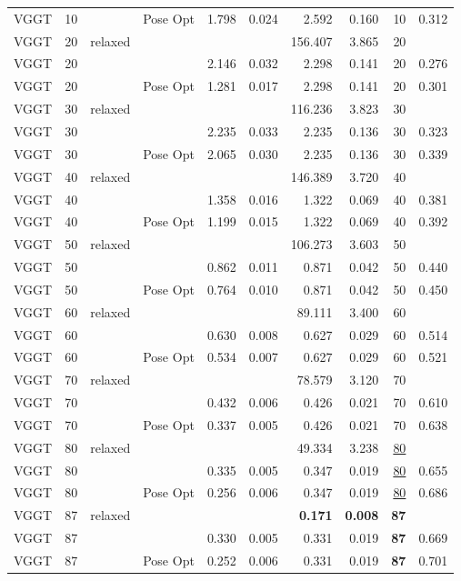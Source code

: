 \begin{table}[H]
\begin{tabular}{lrllrrrrrr}
VGGT & 10 &  & Pose Opt & 1.798 & 0.024 & 2.592 & 0.160 & 10 & 0.312 \\
VGGT & 20 & relaxed &  &  &  & 156.407 & 3.865 & 20 &  \\
VGGT & 20 &  &  & 2.146 & 0.032 & 2.298 & 0.141 & 20 & 0.276 \\
VGGT & 20 &  & Pose Opt & 1.281 & 0.017 & 2.298 & 0.141 & 20 & 0.301 \\
VGGT & 30 & relaxed &  &  &  & 116.236 & 3.823 & 30 &  \\
VGGT & 30 &  &  & 2.235 & 0.033 & 2.235 & 0.136 & 30 & 0.323 \\
VGGT & 30 &  & Pose Opt & 2.065 & 0.030 & 2.235 & 0.136 & 30 & 0.339 \\
VGGT & 40 & relaxed &  &  &  & 146.389 & 3.720 & 40 &  \\
VGGT & 40 &  &  & 1.358 & 0.016 & 1.322 & 0.069 & 40 & 0.381 \\
VGGT & 40 &  & Pose Opt & 1.199 & 0.015 & 1.322 & 0.069 & 40 & 0.392 \\
VGGT & 50 & relaxed &  &  &  & 106.273 & 3.603 & 50 &  \\
VGGT & 50 &  &  & 0.862 & 0.011 & 0.871 & 0.042 & 50 & 0.440 \\
VGGT & 50 &  & Pose Opt & 0.764 & 0.010 & 0.871 & 0.042 & 50 & 0.450 \\
VGGT & 60 & relaxed &  &  &  & 89.111 & 3.400 & 60 &  \\
VGGT & 60 &  &  & 0.630 & 0.008 & 0.627 & 0.029 & 60 & 0.514 \\
VGGT & 60 &  & Pose Opt & 0.534 & 0.007 & 0.627 & 0.029 & 60 & 0.521 \\
VGGT & 70 & relaxed &  &  &  & 78.579 & 3.120 & 70 &  \\
VGGT & 70 &  &  & 0.432 & 0.006 & 0.426 & 0.021 & 70 & 0.610 \\
VGGT & 70 &  & Pose Opt & 0.337 & 0.005 & 0.426 & 0.021 & 70 & 0.638 \\
VGGT & 80 & relaxed &  &  &  & 49.334 & 3.238 & \underline{80} &  \\
VGGT & 80 &  &  & 0.335 & 0.005 & 0.347 & 0.019 & \underline{80} & 0.655 \\
VGGT & 80 &  & Pose Opt & 0.256 & 0.006 & 0.347 & 0.019 & \underline{80} & 0.686 \\
VGGT & 87 & relaxed &  &  &  & \textbf{0.171} & \textbf{0.008} & \textbf{87} &  \\
VGGT & 87 &  &  & 0.330 & 0.005 & 0.331 & 0.019 & \textbf{87} & 0.669 \\
VGGT & 87 &  & Pose Opt & 0.252 & 0.006 & 0.331 & 0.019 & \textbf{87} & 0.701 \\
\bottomrule
\end{tabular}
\end{table}
